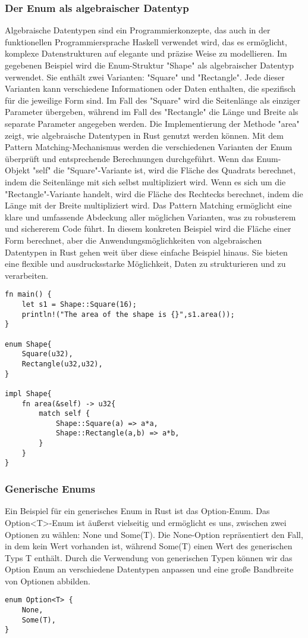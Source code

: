\documentclass[a4paper, 1ppt]{article}
\begin{document}
\subsubsection{Der Enum als algebraischer Datentyp}
Algebraische Datentypen sind ein Programmierkonzepte, das auch in der funktionellen Programmiersprache Haskell verwendet wird, das es ermöglicht, komplexe Datenstrukturen auf elegante und präzise Weise zu modellieren. 
Im gegebenen Beispiel wird die Enum-Struktur "Shape" als algebraischer Datentyp verwendet. Sie enthält zwei Varianten: "Square" und "Rectangle". Jede dieser Varianten kann verschiedene Informationen oder Daten enthalten, die spezifisch für die jeweilige Form sind. Im Fall des "Square" wird die Seitenlänge als einziger Parameter übergeben, während im Fall des "Rectangle" die Länge und Breite als separate Parameter angegeben werden.
Die Implementierung der Methode "area" zeigt, wie algebraische Datentypen in Rust genutzt werden können. Mit dem Pattern Matching-Mechanismus werden die verschiedenen Varianten der Enum überprüft und entsprechende Berechnungen durchgeführt. Wenn das Enum-Objekt "self" die "Square"-Variante ist, wird die Fläche des Quadrats berechnet, indem die Seitenlänge mit sich selbst multipliziert wird. Wenn es sich um die "Rectangle"-Variante handelt, wird die Fläche des Rechtecks berechnet, indem die Länge mit der Breite multipliziert wird.
Das Pattern Matching ermöglicht eine klare und umfassende Abdeckung aller möglichen Varianten, was zu robusterem und sichererem Code führt. In diesem konkreten Beispiel wird die Fläche einer Form berechnet, aber die Anwendungsmöglichkeiten von algebraischen Datentypen in Rust gehen weit über diese einfache Beispiel hinaus. Sie bieten eine flexible und ausdrucksstarke Möglichkeit, Daten zu strukturieren und zu verarbeiten.
\begin{verbatim}
fn main() {
    let s1 = Shape::Square(16);
    println!("The area of the shape is {}",s1.area());
}

enum Shape{
    Square(u32),
    Rectangle(u32,u32),
}

impl Shape{
    fn area(&self) -> u32{
        match self {
            Shape::Square(a) => a*a,
            Shape::Rectangle(a,b) => a*b,
        }
    }
}
\end{verbatim}
\subsubsection{Generische Enums}
Ein Beispiel für ein generisches Enum in Rust ist das Option-Enum.
Das Option<T>-Enum ist äußerst vielseitig und ermöglicht es uns, zwischen zwei Optionen zu wählen: None und Some(T). Die None-Option repräsentiert den Fall, in dem kein Wert vorhanden ist, während Some(T) einen Wert des generischen Typs T enthält. Durch die Verwendung von generischen Typen können wir das Option Enum an verschiedene Datentypen anpassen und eine große Bandbreite von Optionen abbilden.
\begin{verbatim}
enum Option<T> {
	None,
	Some(T),
}
\end{verbatim}
\end{document}
